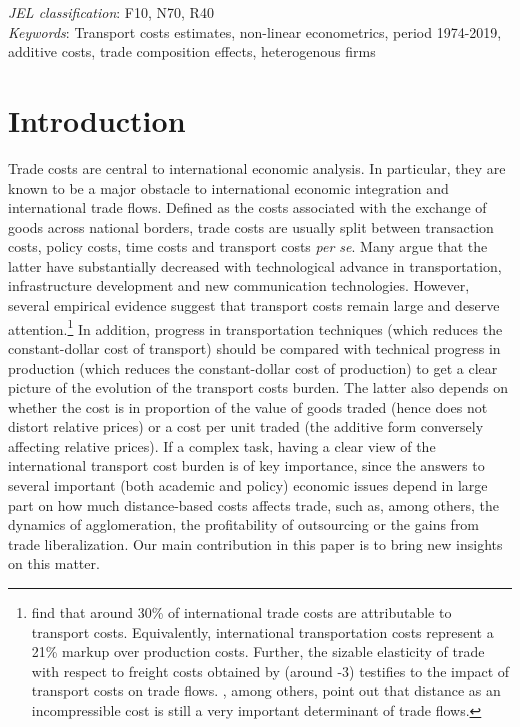 \documentclass[a4paper,11pt]{article}
\begin{document}
\thispagestyle{empty} \pagestyle{plain} \setcounter{page}{1}

\bigskip


\noindent \emph{JEL classification}: F10, N70, R40 \\
\noindent \emph{Keywords}: Transport costs estimates, non-linear econometrics, period 1974-2019, additive costs, trade composition effects, heterogenous firms

{\normalsize \vspace{0cm} }

{\normalsize \titlepage }

{\normalsize \newpage }


\section{Introduction \label{sec:Intro}}


Trade costs are central to international economic analysis. In particular, they are known to be a major obstacle to international economic integration and international trade flows. Defined as the costs associated with the exchange of goods across
national borders, trade costs are usually split between transaction costs, policy costs, time costs and transport costs \textit{per se}. Many argue that the latter have substantially decreased with technological advance in transportation, infrastructure development
and new communication technologies. However, several empirical evidence
suggest that transport costs remain large and deserve attention.\footnote{\cite{anderson_wincoop_jel} find that around 30\% of international trade costs are attributable to transport costs. Equivalently, international transportation costs represent a 21\% markup over production costs. Further, the sizable elasticity of trade with respect to freight costs obtained by \cite{Behar_Venables} (around -3) testifies to the impact of transport costs on trade flows. \cite{Disdier_Head08}, among others, point out that distance as an incompressible cost is still a very important determinant of trade flows.} In addition, progress in transportation techniques (which reduces the constant-dollar cost of transport) should be compared with technical progress in production (which reduces the constant-dollar cost of production) to get a clear picture of the evolution
of the transport costs burden. The latter also depends on whether the cost is in proportion of the value of goods traded (hence does not distort relative prices) or a cost per unit traded (the additive form conversely affecting relative prices). If a complex task, having a clear view of the international transport cost burden is of key importance, since the answers to several important (both academic and policy) economic issues depend in large part on how much distance-based costs affects trade, such as, among others, the dynamics of agglomeration, the profitability of outsourcing or the gains from trade liberalization. Our main contribution in this paper is to bring new insights on this matter.\smallskip
\end{document}
